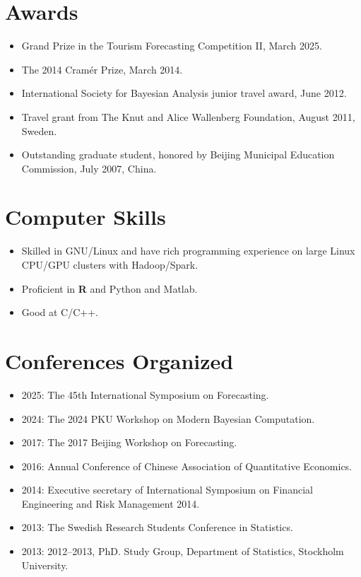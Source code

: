 \documentclass[twoside,a4paper]{article}
\begin{document}
\section{Awards}
\begin{itemize}

\item Grand Prize in the Tourism Forecasting Competition II, March 2025.

\item The 2014 Cramér Prize, March 2014.

\item International Society for Bayesian Analysis junior travel award, June 2012.

\item Travel grant from The Knut and Alice Wallenberg Foundation, August 2011, Sweden.

\item Outstanding graduate student, honored by Beijing Municipal Education Commission, July 2007, China.

\end{itemize}


\section{Computer Skills}
\begin{itemize}
\item Skilled in GNU/Linux and have rich programming experience on large Linux CPU/GPU clusters with Hadoop/Spark.
\item Proficient in \textbf{R} and Python and Matlab.
\item Good at C/C++.
\end{itemize}

\section{Conferences Organized}

\begin{itemize}

\item 2025: The 45th International Symposium on Forecasting.
\item 2024: The 2024 PKU Workshop on Modern Bayesian Computation.
\item 2017: The 2017 Beijing Workshop on Forecasting.
\item 2016: Annual Conference of Chinese Association of Quantitative Economics.
\item 2014: Executive secretary of International Symposium on Financial Engineering and Risk Management 2014.
\item 2013: The Swedish Research Students Conference in Statistics.
\item 2013: 2012–2013, PhD. Study Group, Department of Statistics, Stockholm University.
\end{itemize}
\end{document}
